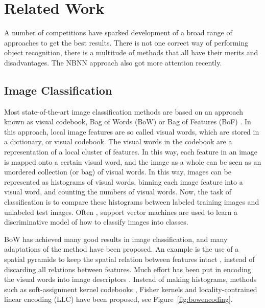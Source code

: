\chapter{Related Work} %
\label{cha:related_work}
A number of competitions have sparked development of a broad range of approaches to get the best results. There is not one correct way of performing object recognition, there is a multitude of methods that all have their merits and disadvantages. The NBNN approach also got more attention recently.

\section{Image Classification} %
\label{sec:image_classification}

Most state-of-the-art image classification methods are based on an approach known as visual codebook, Bag of Words (BoW) or Bag of Features (BoF) \cite{chatfield2011devil, lazebnik2006beyond, liu2011defense, van2010visual, van2011exploiting, wang2010locality}. In this approach, local image features are so called visual words, which are stored in a dictionary, or visual codebook. The visual words in the codebook are a representation of a local cluster of features. In this way, each feature in an image is mapped onto a certain visual word, and the image as a whole can be seen as an unordered collection (or bag) of visual words. In this way, images can be represented as histograms of visual words, binning each image feature into a visual word, and counting the numbers of visual words. Now, the task of classification is to compare these histograms between labeled training images and unlabeled test images. Often \cite{chatfield2011devil}, support vector machines are used to learn a discriminative model of how to classify images into classes.

BoW has achieved many good results in image classification, and many adaptations of the method have been proposed. An example is the use of a spatial pyramids to keep the spatial relation between features intact \cite{lazebnik2006beyond}, instead of discarding all relations between features. Much effort has been put in encoding the visual words into image descriptors \cite{chatfield2011devil}. Instead of making histograms, methods such as soft-assignment kernel codebooks \cite{liu2011defense, van2010visual}, Fisher kernels and locality-contrained linear encoding (LLC) \cite{wang2010locality} have been proposed, see Figure~\ref{fig:bowencoding}.


